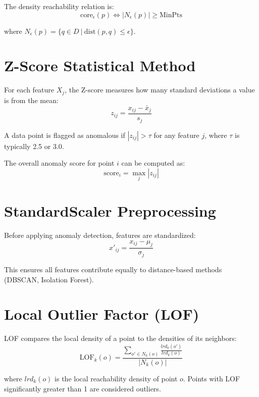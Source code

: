 \documentclass[12pt,a4paper]{report}
\begin{document}
The density reachability relation is:
\begin{equation}
\text{core}_\epsilon(p) \Leftrightarrow |N_\epsilon(p)| \geq \text{MinPts}
\end{equation}

where $N_\epsilon(p) = \{q \in D \ | \ \text{dist}(p, q) \leq \epsilon\}$.

\section{Z-Score Statistical Method}

For each feature $X_j$, the Z-score measures how many standard deviations a value is from the mean:
\begin{equation}
z_{ij} = \frac{x_{ij} - \bar{x}_j}{s_j}
\end{equation}

A data point is flagged as anomalous if $|z_{ij}| > \tau$ for any feature $j$, where $\tau$ is typically 2.5 or 3.0.

The overall anomaly score for point $i$ can be computed as:
\begin{equation}
\text{score}_i = \max_j |z_{ij}|
\end{equation}

\section{StandardScaler Preprocessing}

Before applying anomaly detection, features are standardized:
\begin{equation}
x'_{ij} = \frac{x_{ij} - \mu_j}{\sigma_j}
\end{equation}

This ensures all features contribute equally to distance-based methods (DBSCAN, Isolation Forest).

\section{Local Outlier Factor (LOF)}

LOF compares the local density of a point to the densities of its neighbors:
\begin{equation}
\text{LOF}_k(o) = \frac{\sum_{o' \in N_k(o)} \frac{lrd_k(o')}{lrd_k(o)}}{|N_k(o)|}
\end{equation}

where $lrd_k(o)$ is the local reachability density of point $o$. Points with LOF significantly greater than 1 are considered outliers.
\end{document}

